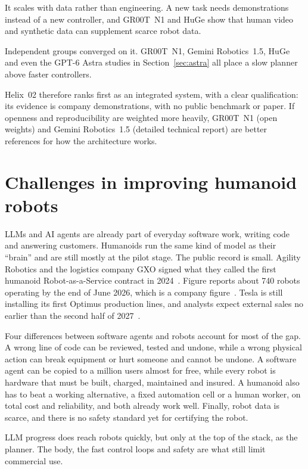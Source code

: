 \documentclass[11pt,a4paper]{article}
\begin{document}
It scales with data rather than engineering.  A new task needs demonstrations
instead of a new controller, and GR00T~N1 and HuGe show that human video and
synthetic data can supplement scarce robot data.

Independent groups converged on it.  GR00T~N1, Gemini Robotics~1.5, HuGe and
even the GPT-6 Astra studies in Section~\ref{sec:astra} all place a slow
planner above faster controllers.

Helix~02 therefore ranks first as an integrated system, with a clear
qualification: its evidence is company demonstrations, with no public benchmark
or paper.  If openness and reproducibility are weighted more heavily,
GR00T~N1 (open weights) and Gemini Robotics~1.5 (detailed technical report)
are better references for how the architecture works.

\section{Challenges in improving humanoid robots}

LLMs and AI agents are already part of everyday software work, writing code
and answering customers.  Humanoids run the same kind of model as their
``brain'' and are still mostly at the pilot stage.  The public record is
small.  Agility Robotics and the logistics company GXO signed what they called
the first humanoid Robot-as-a-Service contract in 2024~\cite{agility-wiki}.
Figure reports about 740 robots operating by the end of June 2026, which is a
company figure~\cite{figure-wiki}.  Tesla is still installing its first
Optimus production lines, and analysts expect external sales no earlier than
the second half of 2027~\cite{investorplace-optimus}.

Four differences between software agents and robots account for most of the
gap.  A wrong line of code can be reviewed, tested and undone, while a wrong
physical action can break equipment or hurt someone and cannot be undone.  A
software agent can be copied to a million users almost for free, while every
robot is hardware that must be built, charged, maintained and insured.  A
humanoid also has to beat a working alternative, a fixed automation cell or a
human worker, on total cost and reliability, and both already work well.
Finally, robot data is scarce, and there is no safety standard yet for
certifying the robot.

LLM progress does reach robots quickly, but only at the top of the stack, as
the planner.  The body, the fast control loops and safety are what still limit
commercial use.
\end{document}
